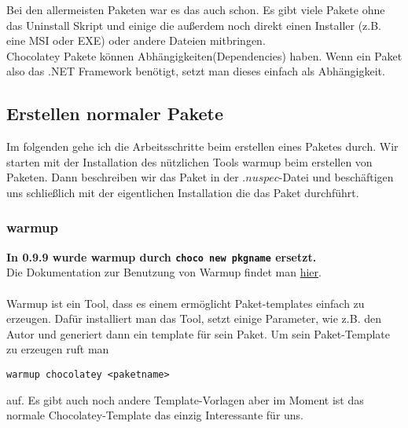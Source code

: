 \documentclass[10pt,a4paper]{article}
\begin{document}
Bei den allermeisten Paketen war es das auch schon. Es gibt viele Pakete ohne das Uninstall Skript und einige die außerdem noch direkt einen Installer (z.B. eine MSI oder EXE) oder andere Dateien mitbringen.\\
Chocolatey Pakete können Abhängigkeiten(Dependencies) haben. Wenn ein Paket also das .NET Framework benötigt, setzt man dieses einfach als Abhängigkeit.

\subsection{Erstellen normaler Pakete}
Im folgenden gehe ich die Arbeitsschritte beim erstellen eines Paketes durch.
Wir starten mit der Installation des nützlichen Tools warmup beim erstellen von Paketen. Dann beschreiben wir das Paket in der $.nuspec$-Datei und beschäftigen uns schließlich mit der eigentlichen Installation die das Paket durchführt.

\subsubsection{warmup}
\textbf{In 0.9.9 wurde warmup durch \lstinline$choco new pkgname$ ersetzt.}	
\\
Die Dokumentation zur Benutzung von Warmup findet man \href{https://github.com/chocolatey/chocolatey/wiki/CreatePackages#is-there-a-simpler-way-of-creating-packages}{hier}.\\
\\
Warmup ist ein Tool, dass es einem ermöglicht Paket-templates einfach zu erzeugen. Dafür installiert man das Tool, setzt einige Parameter, wie z.B. den Autor und generiert dann ein template für sein Paket. Um sein Paket-Template zu erzeugen ruft man 

\begin{lstlisting}
warmup chocolatey <paketname>
\end{lstlisting}
auf. Es gibt auch noch andere Template-Vorlagen aber im Moment ist das normale Chocolatey-Template das einzig Interessante für uns.
\end{document}
